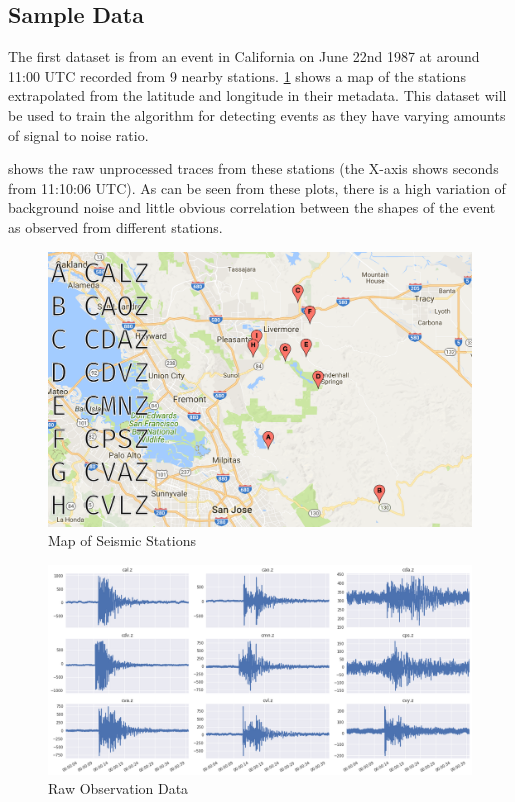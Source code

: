 \documentclass[../report.tex]{subfiles}
\begin{document}
\subsection{Sample Data} \label{sec:sampledata}
	The first dataset is from an event in California on June 22nd 1987 at around 11:00 UTC recorded from 9 nearby stations. \cref{fig:calmap} shows a map of the stations extrapolated from the latitude and longitude in their metadata.  This dataset will be used to train the algorithm for detecting events as they have varying amounts of signal to noise ratio.
	
	 shows the raw unprocessed traces from these stations (the X-axis shows seconds from 11:10:06 UTC).  As can be seen from these plots, there is a high variation of background noise and little obvious correlation between the shapes of the event as observed from different stations.
	
\begin{figure}[H]
	\centering
	\includegraphics[width=0.7\linewidth]{img/cal-map-key}
	\caption{Map of Seismic Stations}
	\label{fig:calmap}
\end{figure}

\begin{figure}[H]
	\centering
	\includegraphics[width=1\linewidth]{img/cal_raw}
	\caption{Raw Observation Data}
	\label{fig:calraw}
\end{figure}
\end{document}
